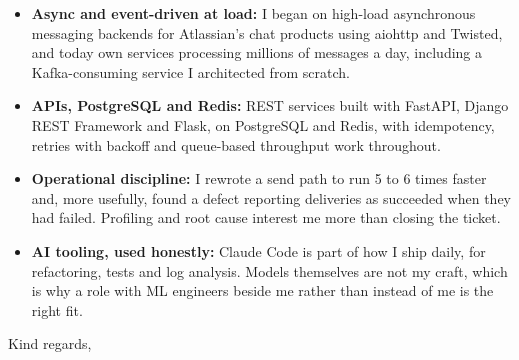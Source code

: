 \documentclass[]{cover}
\begin{document}
\currentdate{\today}



{\raggedright{}\fontsize{11pt}{13pt}\selectfont
\begin{itemize}
    \item \textbf{Async and event-driven at load:} I began on high-load asynchronous messaging backends for Atlassian's chat products using aiohttp and Twisted, and today own services processing millions of messages a day, including a Kafka-consuming service I architected from scratch.
    \item \textbf{APIs, PostgreSQL and Redis:} REST services built with FastAPI, Django REST Framework and Flask, on PostgreSQL and Redis, with idempotency, retries with backoff and queue-based throughput work throughout.
    \item \textbf{Operational discipline:} I rewrote a send path to run 5 to 6 times faster and, more usefully, found a defect reporting deliveries as succeeded when they had failed. Profiling and root cause interest me more than closing the ticket.
    \item \textbf{AI tooling, used honestly:} Claude Code is part of how I ship daily, for refactoring, tests and log analysis. Models themselves are not my craft, which is why a role with ML engineers beside me rather than instead of me is the right fit.
\end{itemize}\par}
\vspace{6pt}


\begin{flushright}
\closing{Kind regards,}
\signature{Artem Sokoliuk}
\end{flushright}
\end{document}
